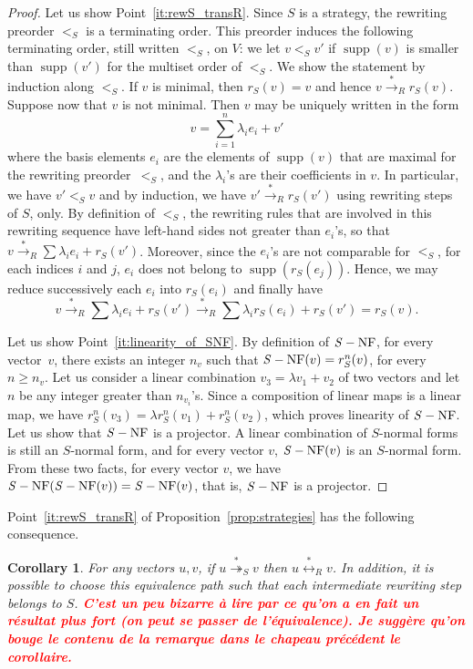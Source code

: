 \documentclass[11pt]{article}
\newtheorem{corollary}[theorem]{Corollary}
\theoremstyle{definition}
\newcommand\todo[1]{{\bf\textcolor{red}{#1}}}
\newcommand\ordS{<_S}
\DeclareMathOperator{\supp}{supp}
\newcommand\transR{\overset{*}{\to}_R}
\newcommand\transParS{\overset{*}{\twoheadrightarrow}_S}
\newcommand\equivR{\overset{*}{\leftrightarrow}_R}
\DeclareMathOperator{\SNF}{{\it S}-NF}
\begin{document}
\begin{proof}
  Let us show Point~\ref{it:rewS_transR}. Since $S$ is a strategy, the
  rewriting preorder $\ordS$ is a terminating order. This preorder
  induces the following terminating order, still written $\ordS$, on $V$:
  we let $v\ordS v'$ if $\supp(v)$ is smaller than $\supp(v')$ for the
  multiset order of $\ordS$. We show the statement by induction along
  $\ordS$. If $v$ is minimal, then $r_S(v)=v$ and hence
  $v\transR r_S(v)$. Suppose now that $v$ is not minimal. Then $v$ may be
  uniquely written in the form
  \begin{equation}\label{equ:decompo_max}
    v=\sum_{i=1}^n\lambda_ie_i+v'
  \end{equation}
  where the basis elements $e_i$ are the elements of $\supp(v)$ that are
  maximal for the rewriting preorder~$\ordS$, and the $\lambda_i$'s are
  their coefficients in $v$. In particular, we have $v'\ordS v$ and by
  induction, we have $v'\transR r_S(v')$ using rewriting steps of $S$,
  only. By definition of $<_S$, the rewriting rules that are involved in
  this rewriting sequence have left-hand sides not greater than $e_i$'s,
  so that $v\transR\sum\lambda_ie_i+r_S(v')$. Moreover, since the $e_i$'s
  are not comparable for $\ordS$, for each indices $i$ and $j$, $e_i$
  does not belong to $\supp(r_S(e_j))$. Hence, we may reduce successively
  each $e_i$ into $r_S(e_i)$ and finally have
  \[
  v \transR
  \sum \lambda_ie_i+r_S(v') \transR
  \sum\lambda_ir_S(e_i) + r_S(v')
  =r_S(v).\]
    
  Let us show Point~\ref{it:linearity_of_SNF}. By definition of $\SNF$,
  for every vector~$v$, there exists an integer $n_v$ such that
  $\SNF(v)=r_S^n(v)$, for every $n\geq n_v$. Let us consider a linear
  combination $v_3=\lambda v_1+v_2$ of two vectors and let $n$ be any
  integer greater than $n_{v_i}$'s. Since a composition of linear maps is
  a linear map, we have $r_S^n(v_3)=\lambda r_S^n(v_1)+r_S^n(v_2)$, which
  proves linearity of $\SNF$. Let us show that $\SNF$ is a projector. A
  linear combination of $S$-normal forms is still an $S$-normal form, and
  for every vector $v$, $\SNF(v)$ is an $S$-normal form. From these two
  facts, for every vector $v$, we have $\SNF(\SNF(v))=\SNF(v)$, that is,
  $\SNF$ is a projector.
\end{proof}
\smallskip

Point~\ref{it:rewS_transR} of Proposition~\ref{prop:strategies} has the
following consequence.
\smallskip

\begin{corollary}\label{cor:transS_equivR}
  For any vectors $u,v$, if $u \transParS v$ then $u\equivR v$. In
  addition, it is possible to choose this equivalence path such that each
  intermediate rewriting step belongs to $S$. \todo{C'est un peu bizarre
    à lire par ce qu'on a en fait un résultat plus fort (on peut se passer
    de l'équivalence). Je suggère qu'on bouge le contenu de la remarque
    dans le chapeau précédent le corollaire.}
\end{corollary}
\end{document}
